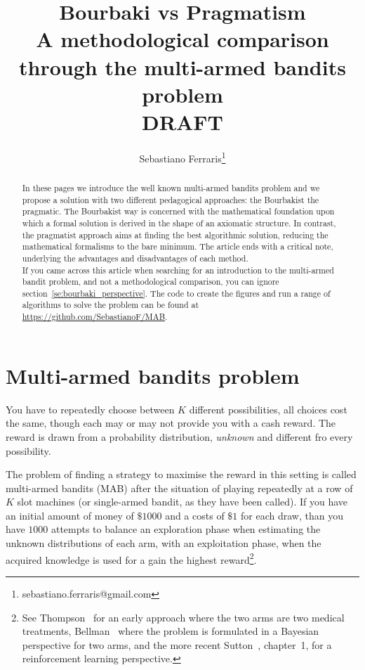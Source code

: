 \documentclass[]{scrartcl}
\title{Bourbaki vs Pragmatism \\ A methodological comparison through the multi-armed bandits problem \\
DRAFT}
\author{Sebastiano Ferraris\footnote{sebastiano.ferraris@gmail.com}}
\theoremstyle{definition}
\begin{document}
\maketitle

\begin{abstract}
In these pages we introduce the well known multi-armed bandits problem and we propose a solution with two different pedagogical approaches: the Bourbakist the pragmatic. The Bourbakist way is concerned with the mathematical foundation upon which a formal solution is derived in the shape of an axiomatic structure. In contrast, the pragmatist approach aims at finding the best algorithmic solution, reducing the mathematical formalisms to the bare minimum.
The article ends with a critical note, underlying the advantages and disadvantages of each method. \\

\noindent
If you came across this article when searching for an introduction to the multi-armed bandit problem, and not a methodological comparison, you can ignore section~\ref{se:bourbaki_perspective}. The code to create the figures and run a range of algorithms to solve the problem can be found at \href{https://github.com/SebastianoF/multi-armed-bandits-testbed}{https://github.com/SebastianoF/MAB}. 
\end{abstract}


\section{Multi-armed bandits problem}
\label{se:intro}
You have to repeatedly choose between $K$ different possibilities, all choices cost the same, though each may or may not provide you with a cash reward. The reward is drawn from a probability distribution, \emph{unknown} and different fro every possibility.

The problem of finding a strategy to maximise the reward in this setting is called multi-armed bandits (MAB) after the situation of playing repeatedly at a row of $K$ slot machines (or single-armed bandit, as they have been called). If you have an initial amount of money of $\$1000$ and a costs of $\$1$ for each draw, than you have $1000$ attempts to balance an exploration phase when estimating the unknown distributions of each arm, with an exploitation phase, when the acquired knowledge is used for a gain the highest reward\footnote{See Thompson~\cite{thompson1933likelihood} for an early approach where the two arms are two medical treatments, Bellman~\cite{bellman1956problem} where the problem is formulated in a Bayesian perspective for two arms, and the more recent Sutton~\cite{sutton2018reinforcement}, chapter~1, for a reinforcement learning perspective.}.
\end{document}

